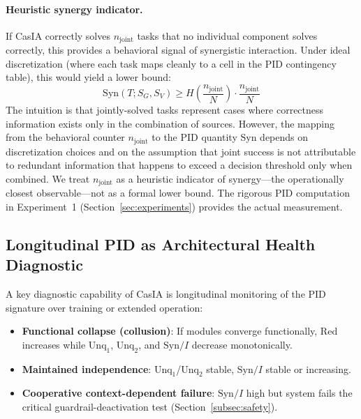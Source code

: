 \documentclass[11pt,a4paper]{article}
\theoremstyle{definition}
\begin{document}
\paragraph{Heuristic synergy indicator.}
\label{heur:synlb}
If CasIA correctly solves $n_\text{joint}$ tasks that no individual component solves correctly, this provides a behavioral signal of synergistic interaction. Under ideal discretization (where each task maps cleanly to a cell in the PID contingency table), this would yield a lower bound:
\begin{equation}
\mathrm{Syn}(T; S_G, S_V) \geq H\!\left(\frac{n_\text{joint}}{N}\right) \cdot \frac{n_\text{joint}}{N}
\end{equation}
The intuition is that jointly-solved tasks represent cases where correctness information exists only in the combination of sources. However, the mapping from the behavioral counter $n_\text{joint}$ to the PID quantity $\mathrm{Syn}$ depends on discretization choices and on the assumption that joint success is not attributable to redundant information that happens to exceed a decision threshold only when combined. We treat $n_\text{joint}$ as a heuristic indicator of synergy---the operationally closest observable---not as a formal lower bound. The rigorous PID computation in Experiment~1 (Section~\ref{sec:experiments}) provides the actual measurement.

\subsection{Longitudinal PID as Architectural Health Diagnostic}
\label{subsec:longitudinal}

A key diagnostic capability of CasIA is longitudinal monitoring of the PID signature over training or extended operation:
\begin{itemize}[leftmargin=*,itemsep=2pt]
\item \textbf{Functional collapse (collusion)}: If modules converge functionally, $\mathrm{Red}$ increases while $\mathrm{Unq}_1$, $\mathrm{Unq}_2$, and $\mathrm{Syn}/I$ decrease monotonically.
\item \textbf{Maintained independence}: $\mathrm{Unq}_1$/$\mathrm{Unq}_2$ stable, $\mathrm{Syn}/I$ stable or increasing.
\item \textbf{Cooperative context-dependent failure}: $\mathrm{Syn}/I$ high but system fails the critical guardrail-deactivation test (Section~\ref{subsec:safety}).
\end{itemize}
\end{document}
